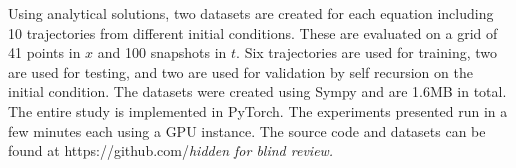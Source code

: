 \documentclass{article}
\begin{document}


Using analytical solutions, two datasets are created for each equation
including 10 trajectories from different initial conditions. These are evaluated on a grid of 41 points in $x$ and 100
snapshots in $t$. Six trajectories are used for training, two are used
for testing, and two are used for validation by self recursion on the
initial condition. %
The datasets were created using Sympy and are 1.6MB in total. The
entire study is implemented in PyTorch. The experiments presented run in a few minutes each using a GPU instance. The source code and datasets can be found at https://github.com/{\em hidden for blind review.}
\end{document}
